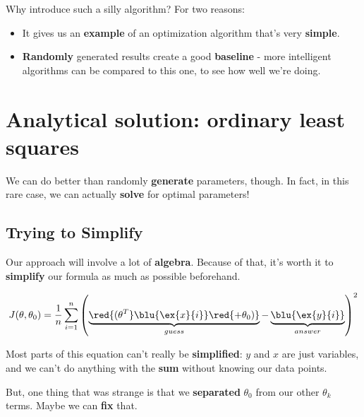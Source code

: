     Why introduce such a silly algorithm? For two reasons:
    
    \begin{itemize}
        \item It gives us an \textbf{example} of an optimization algorithm that's very \textbf{simple}.
        \item \textbf{Randomly} generated results create a good \textbf{baseline} - more intelligent algorithms can be compared to this one, to see how well we're doing.
    \end{itemize}
    

\pagebreak

\section{Analytical solution: ordinary least squares}

    We can do better than randomly \textbf{generate} parameters, though. In fact, in this rare case, we can actually \textbf{solve} for optimal parameters!
    
    \subsection{Trying to Simplify}
        
        Our approach will involve a lot of \textbf{algebra}. Because of that, it's worth it to \textbf{simplify} our formula as much as possible beforehand.
        
        \begin{equation}
            J(\theta,\theta_0) = 
                        \frac{1}{n}  \sum_{i=1}^n 
                        \left( 
                            \underbrace{
                                \red{ (\theta^T} \blu{\ex{x}{i}} \red{ + \theta_0) } 
                            }_{guess}
                            - \underbrace{
                                \blu{\ex{y}{i}}
                            }_{answer}
                        \right)^2 
        \end{equation}
        
        Most parts of this equation can't really be \textbf{simplified}: $y$ and $x$ are just variables, and we can't do anything with the \textbf{sum} without knowing our data points.
        
        But, one thing that was strange is that we \textbf{separated} $\theta_0$ from our other $\theta_k$ terms. Maybe we can \textbf{fix} that.
        
